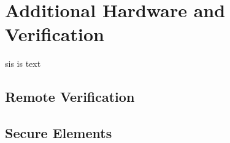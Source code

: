 \section{Additional Hardware and Verification}\label{section:advanced}
sis is text
\subsection{Remote Verification}\label{subsection:advanced-remote}

\subsection{Secure Elements}\label{subsection:advanced-secure}
